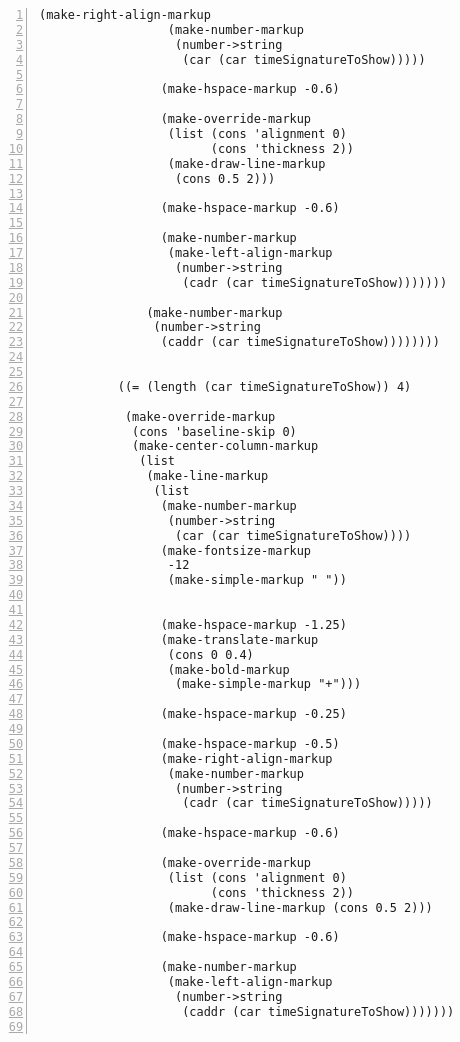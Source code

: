 \begin{Verbatim}[numbers=left,xleftmargin=5mm]
                 (make-right-align-markup
                  (make-number-markup
                   (number->string
                    (car (car timeSignatureToShow)))))

                 (make-hspace-markup -0.6)

                 (make-override-markup
                  (list (cons 'alignment 0)
                        (cons 'thickness 2))
                  (make-draw-line-markup
                   (cons 0.5 2)))

                 (make-hspace-markup -0.6)

                 (make-number-markup
                  (make-left-align-markup
                   (number->string
                    (cadr (car timeSignatureToShow)))))))

               (make-number-markup
                (number->string
                 (caddr (car timeSignatureToShow))))))))


           ((= (length (car timeSignatureToShow)) 4)

            (make-override-markup
             (cons 'baseline-skip 0)
             (make-center-column-markup
              (list
               (make-line-markup
                (list
                 (make-number-markup
                  (number->string
                   (car (car timeSignatureToShow))))
                 (make-fontsize-markup
                  -12
                  (make-simple-markup " "))


                 (make-hspace-markup -1.25)
                 (make-translate-markup
                  (cons 0 0.4)
                  (make-bold-markup
                   (make-simple-markup "+")))

                 (make-hspace-markup -0.25)

                 (make-hspace-markup -0.5)
                 (make-right-align-markup
                  (make-number-markup
                   (number->string
                    (cadr (car timeSignatureToShow)))))

                 (make-hspace-markup -0.6)

                 (make-override-markup
                  (list (cons 'alignment 0)
                        (cons 'thickness 2))
                  (make-draw-line-markup (cons 0.5 2)))

                 (make-hspace-markup -0.6)

                 (make-number-markup
                  (make-left-align-markup
                   (number->string
                    (caddr (car timeSignatureToShow)))))))


\end{Verbatim}
